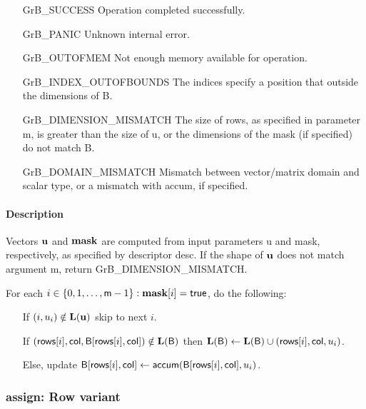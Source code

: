 \begin{itemize}[leftmargin=2.1in]
\item[{\sf GrB\_SUCCESS}]             Operation completed successfully.
\item[{\sf GrB\_PANIC}]               Unknown internal error.
\item[{\sf GrB\_OUTOFMEM}]            Not enough memory available for operation.
\item[{\sf GrB\_INDEX\_OUTOFBOUNDS}]  The indices specify a position that outside the dimensions of {\sf B}.
\item[{\sf GrB\_DIMENSION\_MISMATCH}] 
        The size of {\sf rows}, as specified in parameter {\sf m}, is greater than the size of {\sf u}, or
        the dimensions of the mask (if specified) do not match {\sf B}.
\item[{\sf GrB\_DOMAIN\_MISMATCH}]    Mismatch between vector/matrix domain and scalar type,
                                      or a mismatch with {\sf accum}, if specified.
\end{itemize}

\paragraph{Description}

Vectors ${\bf u}$ and ${\bf mask}$ are computed from input parameters {\sf u} and {\sf mask}, respectively,
as specified by descriptor {\sf desc}. If the shape of ${\bf u}$ does not match argument {\sf m},
return {\sf GrB\_DIMENSION\_MISMATCH}.

For each $i \in \{0, 1, \ldots, {\sf m}-1 \} : {\bf mask}[i] = {\sf true}$, do the following:
\begin{itemize}
	\item[] If $(i,u_{i}) \notin \bold{L}({\bf u})$ skip to next $i$.
	\item[] If $({\sf rows}[i], {\sf col}, {\sf B}[{\sf rows}[i],{\sf col}]) \notin \bold{L}({\sf B})$ then
	      $\bold{L}({\sf B}) \leftarrow \bold{L}({\sf B}) \cup ({\sf rows}[i],{\sf col},u_{i})$.
	\item[]  Else, update ${\sf B}[{\sf rows}[i],{\sf col}] \leftarrow {\sf accum}({\sf B}[{\sf rows}[i],{\sf col}],u_{i})$.
\end{itemize}


\subsubsection{{\sf assign}: Row variant}

